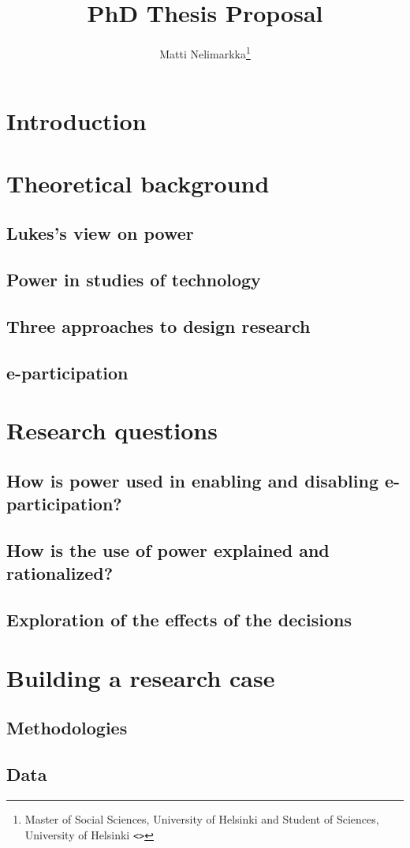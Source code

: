\documentclass[12pt,a4paper]{article}
\author{Matti Nelimarkka\footnote{Master of Social Sciences, University of Helsinki and Student of Sciences, University of Helsinki \texttt{<\email{matti.nelimarkka@hiit.fi}>}}}
\title{PhD Thesis Proposal}
\begin{document}
\maketitle

\tableofcontents

\newpage

\section{Introduction}

\section{Theoretical background}

\subsection{Lukes's view on power}

\subsection{Power in studies of technology}

\subsection{Three approaches to design research}

\subsection{e-participation}

\section{Research questions}

\subsection{How is power used in enabling and disabling e-participation?}

\subsection{How is the use of power explained and rationalized?}

\subsection{Exploration of the effects of the decisions}

\section{Building a research case}

\subsection{Methodologies}

\subsection{Data}


\end{document}
